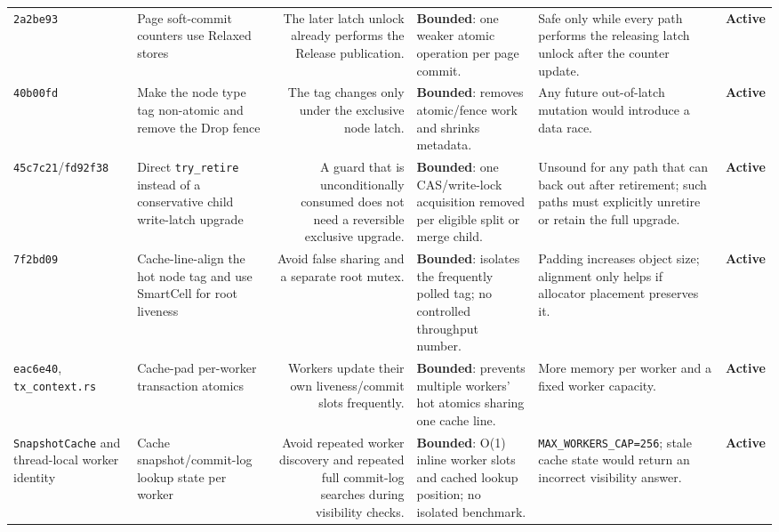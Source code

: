 \documentclass[10pt,a4paper,landscape]{article}
\newcommand{\code}[1]{\texttt{#1}}
\newcommand{\commit}[1]{\code{#1}}
\newcommand{\gainbounded}{\textbf{Bounded}}
\newcommand{\stateactive}{\textbf{Active}}
\begin{document}
\begin{longtable}{IORGKS}
\commit{2a2be93} & Page soft-commit counters use Relaxed stores & The later latch unlock
already performs the Release publication. & \gainbounded: one weaker atomic operation per
page commit. & Safe only while every path performs the releasing latch unlock after the
counter update. & \stateactive \\

\commit{40b00fd} & Make the node type tag non-atomic and remove the Drop fence & The tag
changes only under the exclusive node latch. & \gainbounded: removes atomic/fence work and
shrinks metadata. & Any future out-of-latch mutation would introduce a data race. &
\stateactive \\

\commit{45c7c21}/\commit{fd92f38} & Direct \code{try\_retire} instead of a conservative
child write-latch upgrade & A guard that is unconditionally consumed does not need a
reversible exclusive upgrade. & \gainbounded: one CAS/write-lock acquisition removed per
eligible split or merge child. & Unsound for any path that can back out after retirement;
such paths must explicitly unretire or retain the full upgrade. & \stateactive \\

\commit{7f2bd09} & Cache-line-align the hot node tag and use SmartCell for root liveness &
Avoid false sharing and a separate root mutex. & \gainbounded: isolates the frequently polled
tag; no controlled throughput number. & Padding increases object size; alignment only
helps if allocator placement preserves it. & \stateactive \\

\commit{eac6e40}, \code{tx\_context.rs} & Cache-pad per-worker transaction atomics &
Workers update their own liveness/commit slots frequently. & \gainbounded: prevents multiple
workers' hot atomics sharing one cache line. & More memory per worker and a fixed worker
capacity. & \stateactive \\

\code{SnapshotCache} and thread-local worker identity & Cache snapshot/commit-log lookup
state per worker & Avoid repeated worker discovery and repeated full commit-log searches
during visibility checks. & \gainbounded: O(1) inline worker slots and cached lookup position;
no isolated benchmark. & \code{MAX\_WORKERS\_CAP=256}; stale cache state would return an
incorrect visibility answer. & \stateactive \\
\bottomrule
\end{longtable}
\end{document}
